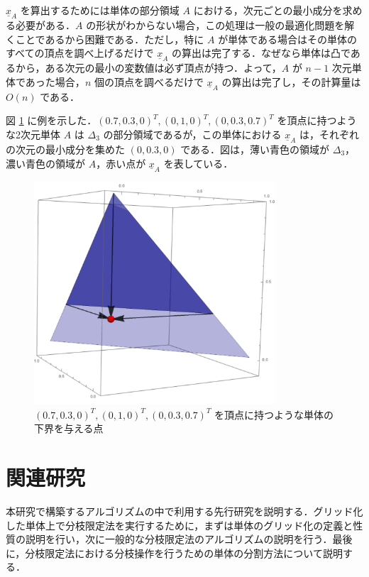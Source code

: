 \documentclass[a4paper,11pt]{jreport}
\begin{document}
$ \underline{x}_A $ を算出するためには単体の部分領域 $ A $ における，次元ごとの最小成分を求める必要がある．$ A $ の形状がわからない場合，この処理は一般の最適化問題を解くことであるから困難である．ただし，特に $ A $ が単体である場合はその単体のすべての頂点を調べ上げるだけで $ \underline{x}_A $ の算出は完了する．なぜなら単体は凸であるから，ある次元の最小の変数値は必ず頂点が持つ．よって，$ A $ が $ n - 1 $ 次元単体であった場合，$ n $ 個の頂点を調べるだけで $ \underline{x}_A $ の算出は完了し，その計算量は $ O(n) $ である． \par
図 \ref{fig:lower_bound_of_simplex} に例を示した．$ (0.7, 0.3, 0)^T, (0, 1, 0)^T, (0, 0.3, 0.7)^T $ を頂点に持つような2次元単体 $ A $ は $ \Delta_3 $ の部分領域であるが，この単体における $ \underline{x}_{A} $ は，それぞれの次元の最小成分を集めた $ (0, 0.3, 0) $ である．図は，薄い青色の領域が $ \Delta_3 $，濃い青色の領域が $ A $，赤い点が $ \underline{x}_{A} $ を表している．\par

\begin{figure}
\begin{center}
\includegraphics[width=9cm]{graphs/lower_bound_of_simplex.pdf}
\caption{$ (0.7, 0.3, 0)^T, (0, 1, 0)^T, (0, 0.3, 0.7)^T $ を頂点に持つような単体の下界を与える点}
\label{fig:lower_bound_of_simplex}
\end{center}
\end{figure}

\chapter{関連研究}

本研究で構築するアルゴリズムの中で利用する先行研究を説明する．グリッド化した単体上で分枝限定法を実行するために，まずは単体のグリッド化の定義と性質の説明を行い，次に一般的な分枝限定法のアルゴリズムの説明を行う．最後に，分枝限定法における分枝操作を行うための単体の分割方法について説明する．
\end{document}
